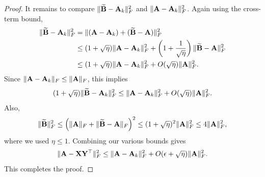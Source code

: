\begin{proof}
It remains to compare \(\|\widetilde{\mathbf{B}}-\mathbf{A}_k\|_F^2\) and
\(\|\mathbf{A}-\mathbf{A}_k\|_F^2\). Again using the cross-term bound,
\[
\begin{aligned}
    \|\widetilde{\mathbf{B}}-\mathbf{A}_k\|_F^2
    &=
    \|(\mathbf{A}-\mathbf{A}_k)+(\widetilde{\mathbf{B}}-\mathbf{A})\|_F^2 \\
    &\leq
    (1+\sqrt{\eta})\|\mathbf{A}-\mathbf{A}_k\|_F^2
    +
    \left(1+\frac{1}{\sqrt{\eta}}\right)
    \|\widetilde{\mathbf{B}}-\mathbf{A}\|_F^2 \\
    &\leq
    (1+\sqrt{\eta})\|\mathbf{A}-\mathbf{A}_k\|_F^2
    +
    O(\sqrt{\eta})\|\mathbf{A}\|_F^2.
\end{aligned}
\]
Since \(\|\mathbf{A}-\mathbf{A}_k\|_F\leq \|\mathbf{A}\|_F\), this implies
\[
    (1+\sqrt{\eta})\|\widetilde{\mathbf{B}}-\mathbf{A}_k\|_F^2
    \leq
    \|\mathbf{A}-\mathbf{A}_k\|_F^2
    +
    O(\sqrt{\eta})\|\mathbf{A}\|_F^2.
\]
Also,
\[
    \|\widetilde{\mathbf{B}}\|_F^2
    \leq
    \left(\|\mathbf{A}\|_F+\|\widetilde{\mathbf{B}}-\mathbf{A}\|_F\right)^2
    \leq
    (1+\sqrt{\eta})^2\|\mathbf{A}\|_F^2
    \leq
    4\|\mathbf{A}\|_F^2,
\]
where we used \(\eta\leq 1\). Combining our various bounds gives
\[
    \|\mathbf{A}-\mathbf{X}\mathbf{Y}^\top\|_F^2
    \leq
    \|\mathbf{A}-\mathbf{A}_k\|_F^2
    +
    O(\epsilon+\sqrt{\eta})\|\mathbf{A}\|_F^2.
\]
This completes the proof.
\end{proof}